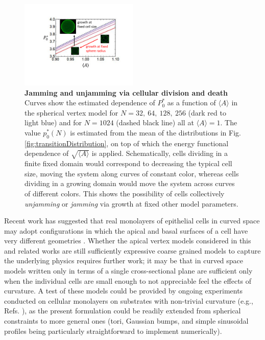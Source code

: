 \documentclass[aps,pre,reprint,superscriptaddress,nofootinbib]{revtex4-2}
\begin{document}
\begin{figure}
\centerline{
\includegraphics[width=0.5\textwidth]{criticalPerimeter}
}
\caption{\label{fig:criticalPerimeter}
{\bf{Jamming and unjamming via cellular division and death}} 
Curves show the estimated dependence of $P_0^*$ as a function of $\langle A \rangle$ in the spherical vertex model for $N=32,\ 64,\ 128,\ 256$ (dark red to light blue) and for $N=1024$ (dashed black line) all at $\langle A \rangle = 1$. The value $p_0^*(N)$ is estimated from the mean of the distributions in Fig. \ref{fig:transitionDistribution}, on top of which the energy functional dependence of $\sqrt{\langle A \rangle}$ is applied. Schematically, cells dividing in a finite fixed domain would correspond to decreasing the typical cell size, moving the system along curves of constant color, whereas cells dividing in a growing domain would move the system across curves of different colors. This shows the possibility of cells collectively \emph{unjamming} or \emph{jamming} via growth at fixed other model parameters.}
\end{figure}


Recent work has suggested that real monolayers of epithelial cells in curved space may adopt configurations in which the apical and basal surfaces of a cell have very different geometries \cite{rupprecht2017geometric,gomez2018scutoids,nelson2018epithelial}. Whether the apical vertex models considered in this and related works are still sufficiently expressive coarse grained models to capture the underlying physics requires further work; it may be that in curved space models written only in terms of a single cross-sectional plane are sufficient only when the individual cells are small enough to not appreciable feel the effects of curvature. A test of these models could be provided by ongoing experiments conducted on cellular monolayers on substrates with non-trivial curvature (e.g., Refs. \cite{harmand20203d,turiv2020topology}), as the present formulation could be readily extended from spherical constraints to more general ones (tori, Gaussian bumps, and simple sinusoidal profiles being particularly straightforward to implement numerically).
\end{document}
